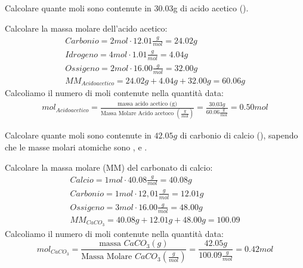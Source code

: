 \begin{ess}
 Calcolare quante moli sono contenute in 30.03g di acido acetico ().
\begin{tasks}
  \task Calcolare la massa molare dell'acido acetico:
  \begin{eqnarray*}
    Carbonio=2mol\cdot 12.01\frac{g}{mol}=24.02g\\
    Idrogeno=4mol\cdot 1.01\frac{g}{mol}=4.04g\\
    Ossigeno=2mol\cdot 16.00\frac{g}{mol}=32.00g\\
    MM_{Acido acetico}=24.02g+4.04g+32.00g=60.06g
  \end{eqnarray*}
  \task Calcoliamo il numero di moli contenute nella quantità data:
  \begin{eqnarray*}
    mol_{Acido acetico} = \frac{\text{massa acido acetico (g)}}{\text{Massa Molare Acido acetoco } \left(\frac{g}{mol}
    \right)} =\frac{30.03g}{60.06\frac{g}{mol}}=0.50mol
  \end{eqnarray*}
\end{tasks} 
\end{ess}
\begin{ess}
 \label{ess:esNmoli}

Calcolare quante moli sono contenute in $42.05g$ di carbonio di calcio (), sapendo che le masse molari
atomiche sono ,  e .
\begin{tasks}
  \task Calcolare la massa molare (MM) del carbonato di calcio:
  \begin{eqnarray*}
    Calcio=1mol\cdot 40.08\frac{g}{mol}=40.08g\\
    Carbonio=1mol\cdot 12,01\frac{g}{mol}=12.01g\\
    Ossigeno=3mol\cdot 16.00\frac{g}{mol}=48.00g\\
    MM_{CaCO_3}=40.08g+12.01g+48.00g=100.09
  \end{eqnarray*}
  \task Calcoliamo il numero di moli contenute nella quantità data:
  \begin{equation*}
    mol_{CaCO_3}=\frac{\text{massa } CaCO_3(g)}{\text{Massa Molare } CaCO_3\left(\frac{g}{mol}\right)}=\frac{42.05g}{100.09\frac{g}{mol}}=0.42mol
  \end{equation*}
\end{tasks} 
\end{ess}
